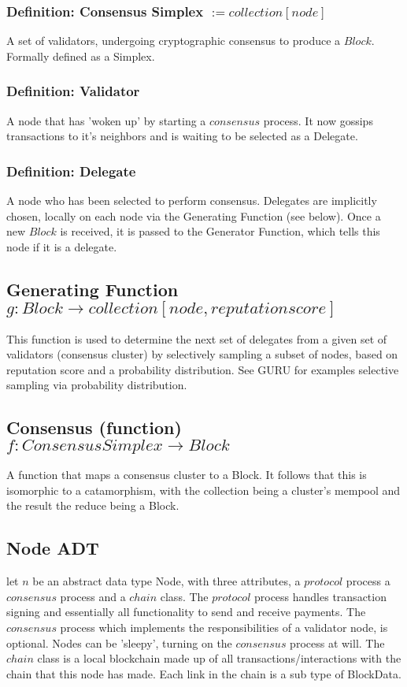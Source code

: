 \documentclass{article}
\begin{document}
\subsubsection{Definition: Consensus Simplex $:= collection[node]$}
A set of validators, undergoing cryptographic consensus to produce a $Block$. Formally defined as a Simplex.

\subsubsection{Definition: Validator}
A node that has 'woken up' by starting a $consensus$ process. It now gossips transactions to it's neighbors and is waiting to be selected as a Delegate.

\subsubsection{Definition: Delegate}
A node who has been selected to perform consensus. Delegates are implicitly chosen, locally on each node via the Generating Function (see below). Once a new $Block$ is received, it is passed to the Generator Function, which tells this node if it is a delegate.

\subsection{Generating Function $g: Block \rightarrow collection[node, reputation score]$}
This function is used to determine the next set of delegates from a given set of validators (consensus cluster) by selectively sampling a subset of nodes, based on reputation score and a probability distribution. See GURU for examples selective sampling via probability distribution.

\subsection{Consensus (function) $f: Consensus Simplex \rightarrow  Block$}
A function that maps a consensus cluster to a Block. It follows that this is isomorphic to a catamorphism, with the collection being a cluster's mempool and the result the reduce being a Block.

\subsection{Node ADT}
let $n$ be an abstract data type Node, with three attributes, a $protocol$ process a $consensus$ process and a $chain$ class. The $protocol$ process handles transaction signing and essentially all functionality to send and receive payments. The $consensus$ process which implements the responsibilities of a validator node, is optional. Nodes can be 'sleepy', turning on the $consensus$ process at will. The $chain$ class is a local blockchain made up of all transactions/interactions with the chain that this node has made. Each link in the chain is a sub type of BlockData.
\end{document}
